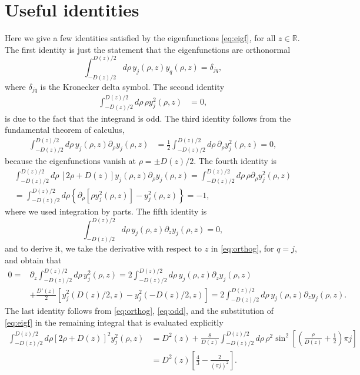 \documentclass[final]{siamltex}
\begin{document}
\section{Useful identities}
\label{ap:identities}
Here we give a few identities satisfied by the eigenfunctions
\eqref{eq:eigf}, for all $z \in \mathbb{R}$. The first identity
is just the statement that the eigenfunctions are orthonormal 
\begin{equation}
\int_{-D(z)/2}^{D(z)/2} d \rho \, y_j(\rho,z) y_q(\rho,z) =
\delta_{jq},
\label{eq:orthog}
\end{equation}
where $\delta_{jq}$ is the Kronecker delta symbol. The second identity
\begin{align}
\int_{-D(z)/2}^{D(z)/2} d \rho \, \rho y_j^2(\rho,z)&= 0,
\label{eq:odd}
\end{align}
is due to the fact that the integrand is odd. The third identity
follows from the fundamental theorem of calculus,
\begin{align}
\int_{-D(z)/2}^{D(z)/2} d \rho\,y_j(\rho,z) \partial_\rho
y_j(\rho,z) &= \frac{1}{2}\int_{-D(z)/2}^{D(z)/2} d \rho \,
\partial_\rho y_j^2(\rho,z) = 0,
\end{align}
because the eigenfunctions vanish at $\rho = \pm D(z)/2$. 
The fourth identity is 
\begin{align}
\int_{-D(z)/2}^{D(z)/2} d \rho \, [2\rho + D(z)] y_j(\rho,z)
\partial_\rho y_j(\rho,z) = \int_{-D(z)/2}^{D(z)/2} d \rho \, \rho
\partial_\rho y_j^2(\rho,z) \nonumber \\ =\int_{-D(z)/2}^{D(z)/2} d
\rho \left\{ \partial_\rho \left[\rho y_j^2(\rho,z)\right] -
y_j^2(\rho,z)\right\} = -1,
\end{align}
where we used integration by parts. The fifth identity is 
\begin{equation}
\int_{-D(z)/2}^{D(z)/2} d \rho \, y_j(\rho,z) \partial_z y_j(\rho,z) = 0,
\end{equation}
and to derive it, we take the derivative with respect to $z$ in
\eqref{eq:orthog}, for $q=j$, and obtain that
\begin{align*}
0 =& \partial_z \int_{-D(z)/2}^{D(z)/2} d \rho \, y_j^2(\rho,z) = 2
\int_{-D(z)/2}^{D(z)/2} d \rho \, y_j(\rho,z) \partial_z
y_j(\rho,z) \\&+ \frac{D'(z)}{2} \left[ y_j^2(D(z)/2,z)-
  y_j^2(-D(z)/2,z)\right] = 2
\int_{-D(z)/2}^{D(z)/2} d \rho \, y_j(\rho,z) \partial_z
y_j(\rho,z).
\end{align*}
The last identity follows from \eqref{eq:orthog}, \eqref{eq:odd}, and
the substitution of \eqref{eq:eigf} in the remaining integral that is
evaluated explicitly
\begin{align}
\int_{-D(z)/2}^{D(z)/2} d \rho [2\rho + D(z)]^2 y_j^2(\rho,z) &=
D^2(z) + \frac{8}{D(z)} \int_{-D(z)/2}^{D(z)/2} d \rho\, \rho^2 \sin^2
\left[ \left(\frac{\rho}{D(z)} + \frac{1}{2} \right) \pi j\right]
\nonumber \\&= D^2(z) \left[\frac{4}{3}-\frac{2}{(\pi j)^2}\right].
\end{align}
\end{document}
